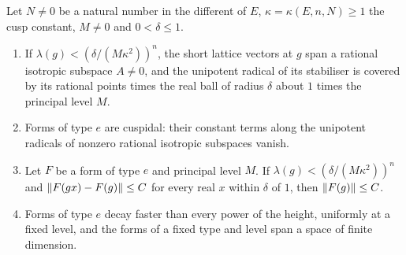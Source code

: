 \begin{theorem}\label{thm:B-cusp}
Let $N\ne0$ be a natural number in the different of $E$, $\kappa=\kappa(E,n,N)\ge1$ the cusp constant, $M\ne0$ and $0<\delta\le1$.
\begin{enumerate}[label=\textup{(\alph*)}]
\item If $\lambda(g)<(\delta/(M\kappa^2))^n$, the short lattice vectors at $g$ span a rational isotropic subspace $A\ne0$, and the unipotent radical of its stabiliser is covered by its rational points times the real ball
of radius $\delta$ about $1$ times the principal level $M$.
\item Forms of type $e$ are cuspidal: their constant terms along the unipotent radicals of nonzero rational isotropic subspaces vanish.
\item Let $F$ be a form of type $e$ and principal level $M$. If $\lambda(g)<(\delta/(M\kappa^2))^n$ and $\lVert F(gx)-F(g)\rVert\le C$ for every real $x$ within $\delta$ of $1$, then $\lVert F(g)\rVert\le C$.
\item Forms of type $e$ decay faster than every power of the height, uniformly at a fixed level, and the forms of a fixed type and level span a space of finite dimension.
\end{enumerate}
\end{theorem}
